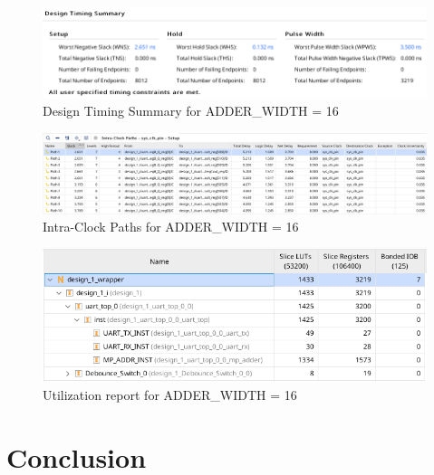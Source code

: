 \documentclass[a4paper,kul]{kulakarticle} %
\begin{document}
\begin{figure}[h]
	\centering
	\includegraphics[width=0.75\linewidth]{images/timing-16-bit.png}
	\caption{Design Timing Summary for ADDER\_WIDTH = 16}
	\label{fig:timing-16-bit}
\end{figure}

\begin{figure}[h]
	\centering
	\includegraphics[width=0.75\linewidth]{images/paths-16-bit.png}
	\caption{Intra-Clock Paths for ADDER\_WIDTH = 16}
	\label{fig:paths-16-bit}
\end{figure}

\begin{figure}[h]
	\centering
	\includegraphics[width=0.75\linewidth]{images/utilization-16-bit.png}
	\caption{Utilization report for ADDER\_WIDTH = 16}
	\label{fig:utilization-16-bit}
\end{figure}

\section{Conclusion}
\end{document}
